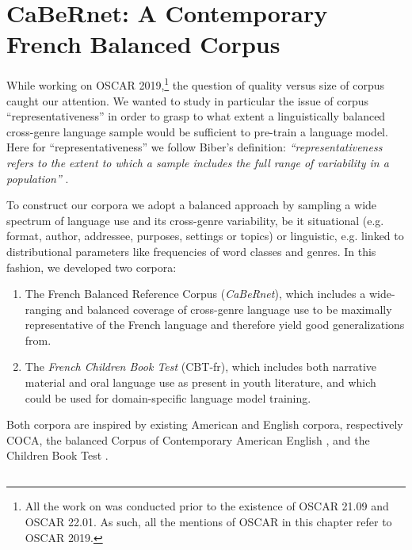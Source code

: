 \section{CaBeRnet: A Contemporary French Balanced Corpus}
\label{sec:DescribeCorpora}

While working on OSCAR 2019,\footnote{All the work on \Cabernet was conducted prior to the existence of OSCAR 21.09 and OSCAR 22.01. As such, all the mentions of OSCAR in this chapter refer to OSCAR 2019.} the question of quality versus size of corpus caught our attention. We wanted to study in particular the issue of corpus ``representativeness'' in order to grasp to what extent a linguistically balanced cross-genre language sample would be sufficient to pre-train a language model. Here for ``representativeness'' we follow Biber's definition: \emph{“representativeness refers to the extent to which a sample includes the full range of variability in a population”} \citep{biber-1993-representativeness}.

To construct our corpora we adopt a balanced approach by sampling a wide spectrum of language use and its cross-genre variability, be it situational (e.g. format, author, addressee, purposes, settings or topics) or linguistic, e.g. linked to distributional parameters like frequencies of word classes and genres. In this fashion, we developed two corpora:
\begin{enumerate}
    \item The French Balanced Reference Corpus (\emph{CaBeRnet}), which includes a wide-ranging and balanced coverage of cross-genre language use to be maximally representative of the French language and therefore yield good generalizations from.
    \item The \emph{French Children Book Test} (CBT-fr), which includes both narrative material and oral language use as present in youth literature, and which could be used for domain-specific language model training.
\end{enumerate}

Both corpora are inspired by existing American and English corpora, respectively  COCA, the balanced Corpus of Contemporary American English \citep{davies-2009-the, davies-2010-the}, and the Children Book Test \citep[CBT]{hill-etal-2016-the}.

\subsection{\Cabernet} \label{subsec:DescribeCaBeRnet}

